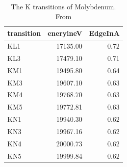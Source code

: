 \begin{table}[ht]
    \centering
    \begin{tabular}{lrr}
        \toprule
        transition & eneryineV & EdgeInA \\
        \midrule
        KL1 & 17135.00 & 0.72 \\
        KL3 & 17479.10 & 0.71 \\
        KM1 & 19495.80 & 0.64 \\
        KM3 & 19607.10 & 0.63 \\
        KM4 & 19768.70 & 0.63 \\
        KM5 & 19772.81 & 0.63 \\
        KN1 & 19940.30 & 0.62 \\
        KN3 & 19967.16 & 0.62 \\
        KN4 & 20000.73 & 0.62 \\
        KN5 & 19999.84 & 0.62 \\
        \bottomrule
    \end{tabular}
    \caption{The K transitions of Molybdenum. From }
\end{table}